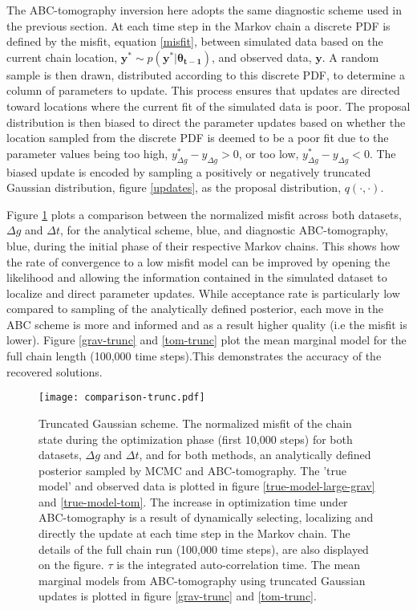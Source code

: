 The ABC-tomography inversion here adopts the same diagnostic scheme used in the previous section. At each time step in the Markov chain a discrete PDF is defined by the misfit, equation \ref{misfit}, between simulated data based on the current chain location, $\bm{y^*} \sim p(\bm{y^*}|\bm{\theta_{t-1}})$,  and observed data, $\bm{y}$. A random sample is then drawn, distributed according to this discrete PDF, to determine a column of parameters to update. This process ensures that updates are directed toward locations where the current fit of the simulated data is poor. The proposal distribution is then biased to direct the parameter updates based on whether the location sampled from the discrete PDF is deemed to be a poor fit due to the parameter values being too high, $y^*_{\Delta g} - y_{\Delta g} > 0$, or too low,  $y^*_{\Delta g} - y_{\Delta g} < 0$. The biased update is encoded by sampling a positively or negatively truncated Gaussian distribution, figure \ref{updates}, as the proposal distribution, $q(\cdot,\cdot)$.\par

Figure \ref{comparison-trunc} plots a comparison between the normalized misfit across both datasets, $\Delta g$ and $\Delta t$, for the analytical scheme, blue, and diagnostic ABC-tomography, blue, during the initial phase of their respective Markov chains. This shows how the rate of convergence to a low misfit model can be improved by opening the likelihood and allowing the information contained in the simulated dataset to localize and direct parameter updates. While acceptance rate is particularly low compared to sampling of the analytically defined posterior, each move in the ABC scheme is more and informed and as a result higher quality (i.e the misfit is lower). Figure \ref{grav-trunc} and \ref{tom-trunc} plot the mean marginal model for the full chain length (100,000 time steps).This demonstrates the accuracy of the recovered solutions.\par

\begin{figure}[H]
	\centering
	\texttt{[image: comparison-trunc.pdf]}
	\caption{Truncated Gaussian scheme. The normalized misfit of the chain state during the optimization phase (first 10,000 steps) for both datasets, $\Delta g$ and $\Delta t$, and for both methods, an analytically defined posterior sampled by MCMC and ABC-tomography. The 'true model' and observed data is plotted in figure \ref{true-model-large-grav} and \ref{true-model-tom}. The increase in optimization time under ABC-tomography is a result of dynamically selecting, localizing and directly the update at each time step in the Markov chain. The details of the full chain run (100,000 time steps), are also displayed on the figure. $\tau$ is the integrated auto-correlation time. The mean marginal models from ABC-tomography using truncated Gaussian updates is plotted in figure \ref{grav-trunc} and \ref{tom-trunc}.}
	\label{comparison-trunc}
\end{figure}

